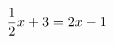\documentclass[preview]{standalone}
\begin{document}
\begin{align*}
\special{dvisvgm:raw <g id='unique000'>}\frac{1}{2}x+3=2x-1 \special{dvisvgm:raw </g>}
\end{align*}
\end{document}
